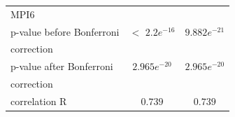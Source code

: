 \begin{table}[ht]
\begin{center}
\begin{tabular}{|l|c|c|}
      MPI6& &\\
            \hspace{1cm} p-value before Bonferroni & $<$ $2.2e^{-16}$ & $9.882e^{-21}$ \\ 
            \hspace{1cm} correction & &\\
            \hspace{1cm} p-value after Bonferroni & $2.965e^{-20}$ & $2.965e^{-20}$  \\ 
            \hspace{1cm} correction & &\\
            \hspace{1cm} correlation R & $0.739$ & $0.739$ \\
      \hline

      
    \end{tabular}
  \end{center}
\end{table}


